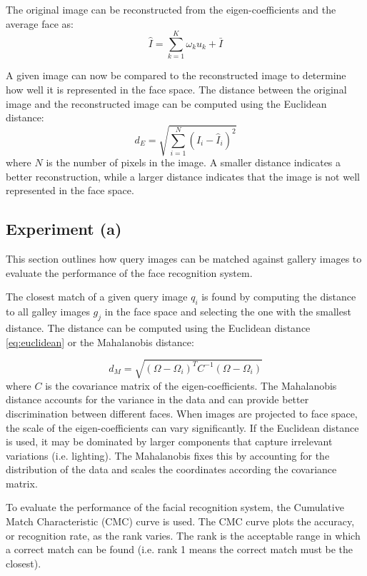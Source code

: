 \documentclass[12pt, letterpaper]{article}
\begin{document}
The original image can be reconstructed from the eigen-coefficients and the average face as:
\begin{equation}
	\hat{I} = \sum_{k=1}^K \omega_k u_k + \bar{I}
\end{equation}

A given image can now be compared to the reconstructed image to determine how well it is
represented in the face space. The distance between the original image and the reconstructed
image can be computed using the Euclidean distance:
\begin{equation}
	d_E = \sqrt{\sum_{i=1}^N (I_i - \hat{I}_i)^2}
\end{equation}
\label{eq:euclidean}
where $N$ is the number of pixels in the image. A smaller distance indicates a better
reconstruction, while a larger distance indicates that the image is not well represented in the
face space.

\subsection{Experiment (a)}

This section outlines how query images can be matched against gallery images to evaluate
the performance of the face recognition system.

The closest match of a given query image $q_i$ is found by computing the distance to all
galley images $g_j$ in the face space and selecting the one with the smallest distance.
The distance can be computed using the Euclidean distance \ref{eq:euclidean}
or the Mahalanobis distance:

\begin{equation}
	d_M = \sqrt{(\Omega - \Omega_i)^T C^{-1} (\Omega - \Omega_i)}
\end{equation}
\label{eq:mahalanobis}
where $C$ is the covariance matrix of the eigen-coefficients. The Mahalanobis distance
accounts for the variance in the data and can provide better discrimination between different
faces. When images are projected to face space, the scale of the eigen-coefficients can vary
significantly. If the Euclidean distance is used, it may be dominated by larger components that
capture irrelevant variations (i.e. lighting). The Mahalanobis fixes this by accounting for the
distribution of the data and scales the coordinates according the covariance matrix.

To evaluate the performance of the facial recognition system, the Cumulative Match Characteristic
(CMC) curve is used. The CMC curve plots the accuracy, or recognition rate, as the rank varies.
The rank is the acceptable range in which a correct match can be found (i.e. rank 1 means the
correct match must be the closest).
\end{document}
